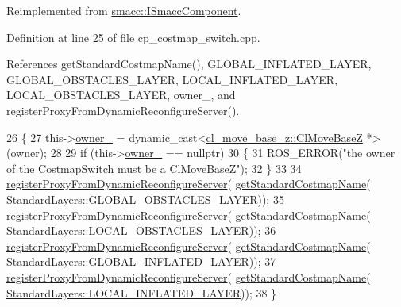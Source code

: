 Reimplemented from \hyperlink{classsmacc_1_1ISmaccComponent_a3378552cb1a86aa26a07c0edc057448b}{smacc\+::\+I\+Smacc\+Component}.



Definition at line 25 of file cp\+\_\+costmap\+\_\+switch.\+cpp.



References get\+Standard\+Costmap\+Name(), G\+L\+O\+B\+A\+L\+\_\+\+I\+N\+F\+L\+A\+T\+E\+D\+\_\+\+L\+A\+Y\+ER, G\+L\+O\+B\+A\+L\+\_\+\+O\+B\+S\+T\+A\+C\+L\+E\+S\+\_\+\+L\+A\+Y\+ER, L\+O\+C\+A\+L\+\_\+\+I\+N\+F\+L\+A\+T\+E\+D\+\_\+\+L\+A\+Y\+ER, L\+O\+C\+A\+L\+\_\+\+O\+B\+S\+T\+A\+C\+L\+E\+S\+\_\+\+L\+A\+Y\+ER, owner\+\_\+, and register\+Proxy\+From\+Dynamic\+Reconfigure\+Server().


\begin{DoxyCode}
26 \{
27     this->\hyperlink{classcl__move__base__z_1_1CostmapSwitch_a42a7da3f7301daa691ef1593ae926618}{owner\_} = \textcolor{keyword}{dynamic\_cast<}\hyperlink{classcl__move__base__z_1_1ClMoveBaseZ}{cl\_move\_base\_z::ClMoveBaseZ} *\textcolor{keyword}{>}(owner);
28 
29     \textcolor{keywordflow}{if} (this->\hyperlink{classcl__move__base__z_1_1CostmapSwitch_a42a7da3f7301daa691ef1593ae926618}{owner\_} == \textcolor{keyword}{nullptr})
30     \{
31         ROS\_ERROR(\textcolor{stringliteral}{"the owner of the CostmapSwitch must be a ClMoveBaseZ"});
32     \}
33 
34     \hyperlink{classcl__move__base__z_1_1CostmapSwitch_a0d04ca7b655f850ba3107393f1c437cb}{registerProxyFromDynamicReconfigureServer}(
      \hyperlink{classcl__move__base__z_1_1CostmapSwitch_ac46796874242fdaa7efef86b66a55102}{getStandardCostmapName}(
      \hyperlink{classcl__move__base__z_1_1CostmapSwitch_af38aeee5e3893e689cd74ddddfe0df15a94404229e09ab748aab0096bd5ff3656}{StandardLayers::GLOBAL\_OBSTACLES\_LAYER}));
35     \hyperlink{classcl__move__base__z_1_1CostmapSwitch_a0d04ca7b655f850ba3107393f1c437cb}{registerProxyFromDynamicReconfigureServer}(
      \hyperlink{classcl__move__base__z_1_1CostmapSwitch_ac46796874242fdaa7efef86b66a55102}{getStandardCostmapName}(
      \hyperlink{classcl__move__base__z_1_1CostmapSwitch_af38aeee5e3893e689cd74ddddfe0df15aff8d30cf6ceac8551691e28c328aebe6}{StandardLayers::LOCAL\_OBSTACLES\_LAYER}));
36     \hyperlink{classcl__move__base__z_1_1CostmapSwitch_a0d04ca7b655f850ba3107393f1c437cb}{registerProxyFromDynamicReconfigureServer}(
      \hyperlink{classcl__move__base__z_1_1CostmapSwitch_ac46796874242fdaa7efef86b66a55102}{getStandardCostmapName}(
      \hyperlink{classcl__move__base__z_1_1CostmapSwitch_af38aeee5e3893e689cd74ddddfe0df15a1757575ee674622adfb325de182a65d6}{StandardLayers::GLOBAL\_INFLATED\_LAYER}));
37     \hyperlink{classcl__move__base__z_1_1CostmapSwitch_a0d04ca7b655f850ba3107393f1c437cb}{registerProxyFromDynamicReconfigureServer}(
      \hyperlink{classcl__move__base__z_1_1CostmapSwitch_ac46796874242fdaa7efef86b66a55102}{getStandardCostmapName}(
      \hyperlink{classcl__move__base__z_1_1CostmapSwitch_af38aeee5e3893e689cd74ddddfe0df15aab9e94e9dc4c62e74e48ee34b11c8807}{StandardLayers::LOCAL\_INFLATED\_LAYER}));
38 \}
\end{DoxyCode}
